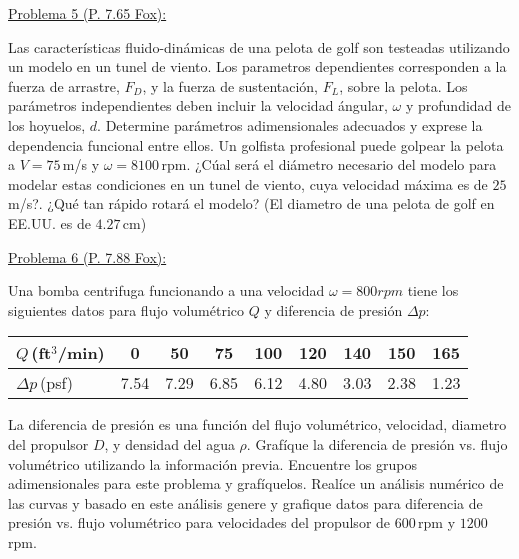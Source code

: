 \documentclass[11pt]{report}
\begin{document}

\newpage

\underline {Problema 5 (P. 7.65 Fox):}
\vspace{0.2cm}

Las caracter\'isticas fluido-din\'amicas de una pelota de golf son testeadas utilizando un modelo en un tunel de viento. Los parametros dependientes corresponden a la fuerza de arrastre, $F_D$, y la fuerza de sustentaci\'on, $F_L$, sobre la pelota. Los par\'ametros independientes deben incluir la velocidad \'angular, $\omega$ y profundidad de los hoyuelos, $d$. Determine par\'ametros adimensionales adecuados y exprese la dependencia funcional entre ellos. Un golfista profesional puede golpear la pelota a $V=75$\,m/s y  $\omega=8100$\,rpm. ¿C\'ual ser\'a el di\'ametro necesario del modelo para modelar estas condiciones en un tunel de viento, cuya velocidad m\'axima es de $25$\,m/s?. ¿Qu\'e tan r\'apido rotar\'a el modelo? (El diametro de una pelota de golf en EE.UU. es de $4.27$\,cm)
\vspace{0.2cm}


\underline {Problema 6 (P. 7.88 Fox):}
\vspace{0.2cm}

Una bomba centrifuga funcionando a una velocidad $\omega=800 rpm$ tiene los siguientes datos para flujo volum\'etrico $Q$ y diferencia de presi\'on $\Delta p$:
\vspace{0.5cm}

\begin{center}
\begin{tabular}{l*8c}
\toprule
$Q$\,(ft$^3$/min) & 0 & 50 & 75 & 100 & 120 & 140 & 150 & 165 \\
\midrule
$\Delta p$\,(psf) & 7.54 & 7.29 & 6.85 & 6.12 & 4.80 & 3.03 & 2.38 & 1.23 \\
\bottomrule
\end{tabular}
\end{center}
\vspace{0.5cm}

La diferencia de presi\'on es una funci\'on del flujo volum\'etrico, velocidad, diametro del propulsor $D$, y densidad del agua $\rho$. Graf\'ique la diferencia de presi\'on vs. flujo volum\'etrico utilizando la informaci\'on previa. Encuentre los grupos adimensionales para este problema y graf\'iquelos. Real\'ice un an\'alisis num\'erico de las curvas y basado en este an\'alisis genere y grafique datos para diferencia de presi\'on vs. flujo volum\'etrico para velocidades del propulsor de $600$\,rpm y $1200$\,rpm.

\end{document}
